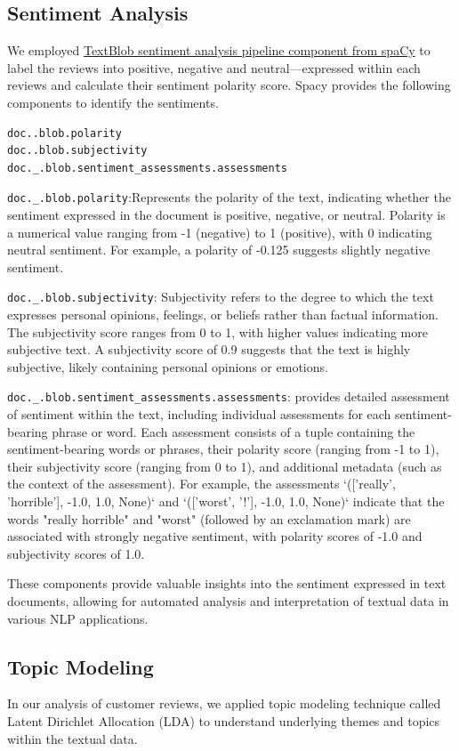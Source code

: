 \documentclass[11pt]{article} %
\begin{document}
\subsection{Sentiment Analysis}
We employed \href{https://spacy.io/universe/project/spacy-textblob}{TextBlob sentiment analysis pipeline component from spaCy} to label the reviews into positive, negative and neutral—expressed within each reviews and calculate their sentiment polarity score. Spacy provides the following components to identify the sentiments.
\begin{verbatim}
doc..blob.polarity
doc..blob.subjectivity
doc._.blob.sentiment_assessments.assessments 
\end{verbatim}

\texttt{doc.\_.blob.polarity}:Represents the polarity of the text, indicating whether the sentiment expressed in the document is positive, negative, or neutral. Polarity is a numerical value ranging from -1 (negative) to 1 (positive), with 0 indicating neutral sentiment. For example, a polarity of -0.125 suggests slightly negative sentiment.

\texttt{doc.\_.blob.subjectivity}: Subjectivity refers to the degree to which the text expresses personal opinions, feelings, or beliefs rather than factual information. The subjectivity score ranges from 0 to 1, with higher values indicating more subjective text. A subjectivity score of 0.9 suggests that the text is highly subjective, likely containing personal opinions or emotions.

\texttt{doc.\_.blob.sentiment\_assessments.assessments}: provides detailed assessment of sentiment within the text, including individual assessments for each sentiment-bearing phrase or word. Each assessment consists of a tuple containing the sentiment-bearing words or phrases, their polarity score (ranging from -1 to 1), their subjectivity score (ranging from 0 to 1), and additional metadata (such as the context of the assessment). For example, the assessments `(['really', 'horrible'], -1.0, 1.0, None)` and `(['worst', '!'], -1.0, 1.0, None)` indicate that the words "really horrible" and "worst" (followed by an exclamation mark) are associated with strongly negative sentiment, with polarity scores of -1.0 and subjectivity scores of 1.0.

These components provide valuable insights into the sentiment expressed in text documents, allowing for automated analysis and interpretation of textual data in various NLP applications.
\subsection{Topic Modeling}
In our analysis of customer reviews, we applied topic modeling technique called Latent Dirichlet Allocation (LDA) to understand underlying themes and topics within the textual data. \\
\end{document}
